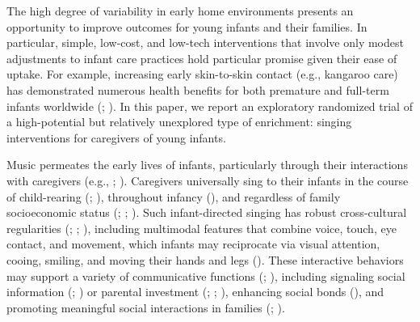 \documentclass[
]{article}
\begin{document}
The high degree of variability in early home environments presents an
opportunity to improve outcomes for young infants and their families. In
particular, simple, low-cost, and low-tech interventions that involve
only modest adjustments to infant care practices hold particular promise
given their ease of uptake. For example, increasing early skin-to-skin
contact (e.g., kangaroo care) has demonstrated numerous health benefits
for both premature and full-term infants worldwide
(;
). In this paper, we report
an exploratory randomized trial of a high-potential but relatively
unexplored type of enrichment: singing interventions for caregivers of
young infants.

Music permeates the early lives of infants, particularly through their
interactions with caregivers (e.g., ; ). Caregivers
universally sing to their infants in the course of child-rearing
(;
), throughout infancy
(), and regardless of family
socioeconomic status (;
;
). Such
infant-directed singing has robust cross-cultural regularities
(;
;
), including multimodal
features that combine voice, touch, eye contact, and movement, which
infants may reciprocate via visual attention, cooing, smiling, and
moving their hands and legs (). These interactive behaviors may support a variety of
communicative functions (; ),
including signaling social information (; ) or parental
investment (;
;
), enhancing social bonds
(), and
promoting meaningful social interactions in families
(;
).
\end{document}
